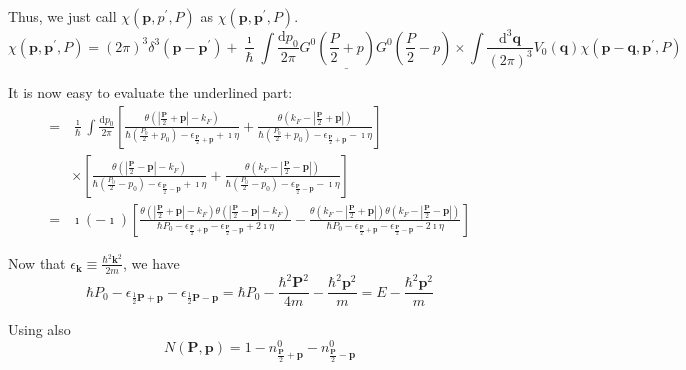Thus, we just call $\chi(\mathbf{p},p^{'},P)$ as $\chi(\mathbf{p},\mathbf{p}^{'},P)$.
\begin{equation} \label{Eqs2.7.14}
\chi(\mathbf{p},\mathbf{p}^{'},P) = (2\pi)^3 \delta^3(\mathbf{p}-\mathbf{p}^{'}) + \underline{\frac{\imath}{\hbar} \int \frac{\mathrm{d}p_0}{2\pi} G^0(\frac{P}{2}+p)G^0(\frac{P}{2}-p)}\times\int\frac{\mathrm{d}^3 \mathbf{q}}{(2\pi)^3}V_0(\mathbf{q}) \chi(\mathbf{p}-\mathbf{q},\mathbf{p}^{'},P)
\end{equation}

It is now easy to evaluate the underlined part:
\[\begin{split} =& \frac{\imath}{\hbar} \int \frac{\mathrm{d}p_0}{2\pi} \left[ \frac{\theta(|\frac{\mathbf{P}}{2}+\mathbf{p}|-k_F)}{\hbar(\frac{P_0}{2}+p_0)-\epsilon_{\frac{\mathbf{P}}{2}+\mathbf{p}}+\imath\eta} + \frac{\theta(k_F-|\frac{\mathbf{P}}{2}+\mathbf{p}|)}{\hbar(\frac{P_0}{2}+p_0)-\epsilon_{\frac{\mathbf{P}}{2}+\mathbf{p}}-\imath\eta} \right] \\
& \times \left[ \frac{\theta(|\frac{\mathbf{P}}{2}-\mathbf{p}|-k_F)}{\hbar(\frac{P_0}{2}-p_0)-\epsilon_{\frac{\mathbf{P}}{2}-\mathbf{p}}+\imath\eta} + \frac{\theta(k_F-|\frac{\mathbf{P}}{2}-\mathbf{p}|)}{\hbar(\frac{P_0}{2}-p_0)-\epsilon_{\frac{\mathbf{P}}{2}-\mathbf{p}}-\imath\eta} \right]\\
=& \imath (-\imath) \left[ \frac{\theta(|\frac{\mathbf{P}}{2}+\mathbf{p}|-k_F)\theta(|\frac{\mathbf{P}}{2}-\mathbf{p}|-k_F)}{\hbar P_0 - \epsilon_{\frac{\mathbf{P}}{2}+\mathbf{p}} - \epsilon_{\frac{\mathbf{P}}{2}-\mathbf{p}} + 2\imath\eta} - \frac{\theta(k_F-|\frac{\mathbf{P}}{2}+\mathbf{p}|)\theta(k_F-|\frac{\mathbf{P}}{2}-\mathbf{p}|)}{\hbar P_0 - \epsilon_{\frac{\mathbf{P}}{2}+\mathbf{p}} - \epsilon_{\frac{\mathbf{P}}{2}-\mathbf{p}} - 2\imath\eta} \right]
\end{split} \]

Now that $\epsilon_\mathbf{k} \equiv \frac{\hbar^2\mathbf{k}^2}{2m}$, we have
\begin{equation*} \label{Eqs2.7.15'}\hbar P_0 - \epsilon_{\frac{1}{2}\mathbf{P}+\mathbf{p}}- \epsilon_{\frac{1}{2}\mathbf{P}-\mathbf{p}} = \hbar P_0 - \frac{\hbar^2\mathbf{P}^2}{4m}-\frac{\hbar^2\mathbf{p}^2}{m}=E-\frac{\hbar^2\mathbf{p}^2}{m}\tag{2.7.15'}\end{equation*}

Using also
\begin{equation} \label{Eqs2.7.15}
N(\mathbf{P},\mathbf{p}) = 1-n^0_{\frac{\mathbf{P}}{2}+\mathbf{p}}-n^0_{\frac{\mathbf{P}}{2}-\mathbf{p}} \end{equation}

